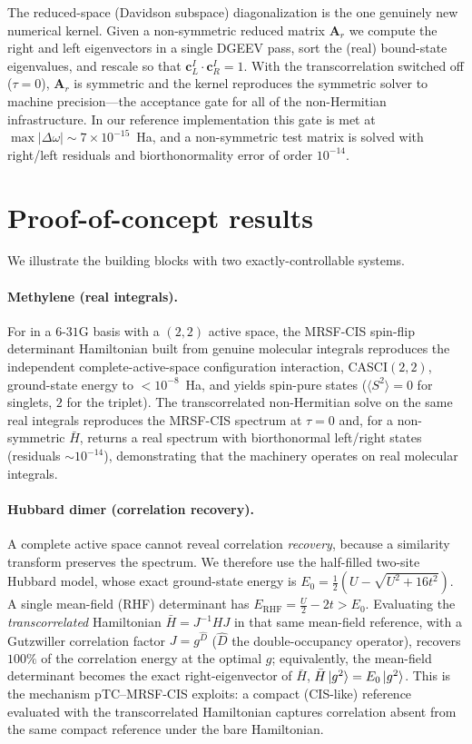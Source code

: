 \documentclass[aps,prb,reprint,superscriptaddress,floatfix]{revtex4-2}
\newcommand{\Hbar}{\bar{H}}
\newcommand{\op}[1]{\hat{#1}}
\begin{document}
The reduced-space (Davidson subspace) diagonalization is the one genuinely new
numerical kernel. Given a non-symmetric reduced matrix $\mathbf{A}_r$ we compute
the right and left eigenvectors in a single DGEEV pass, sort the (real) bound-state
eigenvalues, and rescale so that $\mathbf{c}_L^I\!\cdot\mathbf{c}_R^I=1$. With the
transcorrelation switched off ($\tau=0$), $\mathbf{A}_r$ is symmetric and the
kernel reproduces the symmetric solver to machine precision---the acceptance gate
for all of the non-Hermitian infrastructure. In our reference implementation this
gate is met at $\max|\Delta\omega|\sim7\times10^{-15}$~Ha, and a non-symmetric
test matrix is solved with right/left residuals and biorthonormality error of
order $10^{-14}$.

\section{Proof-of-concept results}

We illustrate the building blocks with two exactly-controllable systems.

\paragraph{Methylene (real integrals).}
For  in a $6$-$31$G basis with a $(2,2)$ active space, the MRSF-CIS
spin-flip determinant Hamiltonian built from genuine molecular integrals
reproduces the independent complete-active-space configuration interaction,
CASCI$(2,2)$, ground-state energy to $<10^{-8}$~Ha, and yields spin-pure states
($\langle S^2\rangle=0$ for singlets, $2$ for the triplet). The transcorrelated
non-Hermitian solve on the same real integrals reproduces the MRSF-CIS spectrum at
$\tau=0$ and, for a non-symmetric $\Hbar$, returns a real spectrum with
biorthonormal left/right states (residuals $\sim10^{-14}$), demonstrating that the
machinery operates on real molecular integrals.

\paragraph{Hubbard dimer (correlation recovery).}
A complete active space cannot reveal correlation \emph{recovery}, because a
similarity transform preserves the spectrum. We therefore use the half-filled
two-site Hubbard model, whose exact ground-state energy is
$E_0=\tfrac12\!\left(U-\sqrt{U^2+16t^2}\right)$. A single mean-field (RHF)
determinant has $E_{\mathrm{RHF}}=\tfrac{U}{2}-2t>E_0$. Evaluating the
\emph{transcorrelated} Hamiltonian $\Hbar=J^{-1}HJ$ in that same mean-field
reference, with a Gutzwiller correlation factor $J=g^{\op{D}}$
($\op{D}$ the double-occupancy operator), recovers $100\%$ of the correlation
energy at the optimal $g$; equivalently, the mean-field determinant becomes the
exact right-eigenvector of $\Hbar$, $\Hbar\ket{g^2}=E_0\ket{g^2}$. This is the
mechanism pTC--MRSF-CIS exploits: a compact (CIS-like) reference evaluated with
the transcorrelated Hamiltonian captures correlation absent from the same compact
reference under the bare Hamiltonian.
\end{document}
